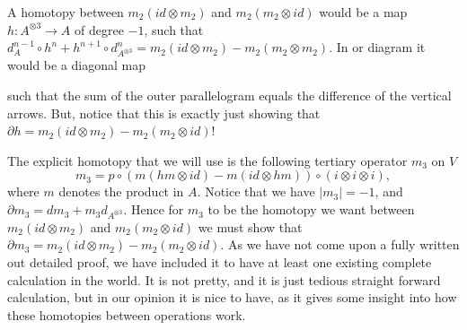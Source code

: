 A homotopy between $m_2(id\otimes m_2)$ and $m_2(m_2\otimes id)$ would be a map $h\colon A^{\otimes 3}\longrightarrow A$ of degree $-1$, such that $d_A^{n-1}\circ h^{n} + h^{n+1}\circ d_{A^{\otimes 3}}^n = m_2(id\otimes m_2)-m_2(m_2\otimes m_2)$. In or diagram it would be a diagonal map
\begin{center}
\end{center}
such that the sum of the outer parallelogram equals the difference of the vertical arrows. But, notice that this is exactly just showing that $\partial h = m_2(id\otimes m_2)-m_2(m_2\otimes id)$!

The explicit homotopy that we will use is the following tertiary operator $m_3$ on $V$
\begin{equation*}
    m_3 = p\circ (m(hm\otimes id)-m(id\otimes hm))\circ (i\otimes i \otimes i),
\end{equation*}
where $m$ denotes the product in $A$. Notice that we have $|m_3|=-1$, and $\partial m_3 = dm_3 + m_3 d_{A^{\otimes 3}}$. Hence for $m_3$ to be the homotopy we want between $m_2(id\otimes m_2)$ and $m_2(m_2\otimes id)$ we must show that $\partial m_3 = m_2(id\otimes m_2)-m_2(m_2\otimes id)$. As we have not come upon a fully written out detailed proof, we have included it to have at least one existing complete calculation in the world. It is not pretty, and it is just tedious straight forward calculation, but in our opinion it is nice to have, as it gives some insight into how these homotopies between operations work. 

